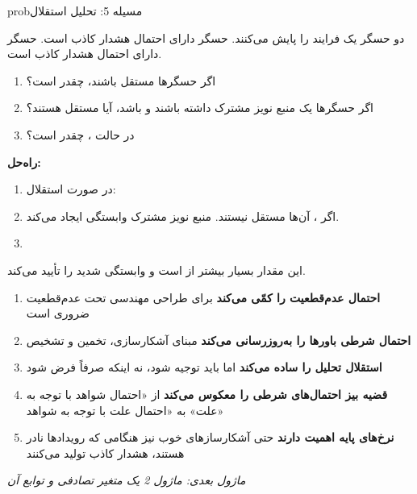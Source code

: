 \begin{PSbox}[unbreakable]{prob}{مسیله 5: تحلیل استقلال}

دو حسگر یک فرایند را پایش می‌کنند. حسگر  دارای احتمال هشدار کاذب  است. حسگر  دارای احتمال هشدار کاذب  است.

\begin{enumerate}
\def\labelenumi{(\PSalph{enumi})}
\tightlist
\item
  اگر حسگرها مستقل باشند،  چقدر است؟
\item
  اگر حسگرها یک منبع نویز مشترک داشته باشند و  باشد، آیا مستقل هستند؟
\item
  در حالت ،  چقدر است؟
\end{enumerate}

\textbf{راه‌حل:}

\begin{enumerate}
\def\labelenumi{(\PSalph{enumi})}
\item
  در صورت استقلال: 
\item
  اگر ، آن‌ها مستقل نیستند. منبع نویز مشترک وابستگی ایجاد می‌کند.
\item
\end{enumerate}

این مقدار بسیار بیشتر از  است و وابستگی شدید را تأیید می‌کند.

\end{PSbox}


\begin{enumerate}
\def\labelenumi{\arabic{enumi}.}
\tightlist
\item
  \textbf{احتمال عدم‌قطعیت را کمّی می‌کند}  برای طراحی مهندسی تحت عدم‌قطعیت ضروری است
\item
  \textbf{احتمال شرطی باورها را به‌روزرسانی می‌کند}  مبنای آشکارسازی، تخمین و تشخیص
\item
  \textbf{استقلال تحلیل را ساده می‌کند}  اما باید توجیه شود، نه اینکه صرفاً فرض شود
\item
  \textbf{قضیه بیز احتمال‌های شرطی را معکوس می‌کند}  از «احتمال شواهد با توجه به علت» به «احتمال علت با توجه به شواهد»
\item
  \textbf{نرخ‌های پایه اهمیت دارند}  حتی آشکارسازهای خوب نیز هنگامی که رویدادها نادر هستند، هشدار کاذب تولید می‌کنند
\end{enumerate}

\emph{ماژول بعدی: {ماژول 2  یک متغیر تصادفی و توابع آن}}
